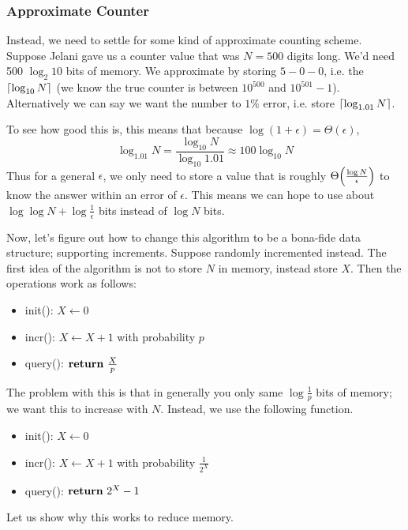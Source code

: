 \subsubsection{Approximate Counter}

Instead, we need to settle for some kind of approximate counting scheme. Suppose Jelani gave us a counter value that was $N = 500$ digits long. We'd need 500 $\log_2 10$ bits of memory.
We approximate by storing $5 - 0 - 0$, i.e. the $\left\lceil \log_{10} N \right\rceil$ (we know the true counter is between $10^{500}$ and $10^{501} - 1$).
Alternatively we can say we want the number to $1 \%$ error, i.e. store $\left\lceil \log_{1.01} N \right\rceil$.

To see how good this is, this means that because $\log(1 + \epsilon) = \Theta(\epsilon)$,
\[ \log_{1.01} N = \frac{\log_{10} N}{\log_{10} 1.01} \approx 100\log_{10} N \]
Thus for a general $\epsilon$, we only need to store a value that is roughly $\Theta\qty(\frac{\log N}{\epsilon})$ to know the answer within an error of $\epsilon$.
This means we can hope to use about $\log \log N + \log \frac{1}{\epsilon}$ bits instead of $\log N$ bits.

Now, let's figure out how to change this algorithm to be a bona-fide data structure; supporting increments. Suppose 
randomly incremented instead. The first idea of the algorithm is not to store $N$ in memory, instead store $X$. Then the operations work as follows:
\begin{itemize}
    \item init(): $X \gets 0$
    \item incr(): $X \gets X + 1$ with probability $p$
    \item query(): $\Return \text{ }  \frac{X}{p}$
\end{itemize}

The problem with this is that in generally you only same $\log \frac{1}{p}$ bits of memory; we want this to increase with $N$.
Instead, we use the following function.

\begin{itemize}
    \item init(): $X \gets 0$
    \item incr(): $X \gets X + 1$ with probability $\frac{1}{2^X}$
    \item query(): $\Return \text{ }  2^X - 1$
\end{itemize}

Let us show why this works to reduce memory. 

